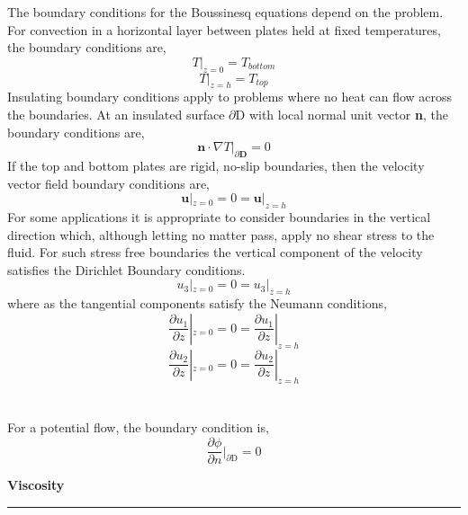 \documentclass[12pt]{article}
\begin{document}
\begin{flushleft}
The boundary conditions for the Boussinesq equations depend on the problem. For convection in a horizontal layer between plates held at fixed temperatures, the boundary conditions are,
$$T|_{z=0} = T_{bottom}$$
$$T|_{z=h} = T_{top}$$
Insulating boundary conditions apply to problems where no heat can flow across the boundaries. At an insulated surface $\partial$D with local normal unit vector \textbf{n}, the boundary conditions are,
$$\textbf{n}\cdot\nabla T|_{\partial \textbf{D}} = 0$$
If the top and bottom plates are rigid, no-slip boundaries, then the velocity vector field boundary conditions are,
$$\textbf{u}|_{z=0} = 0 = \textbf{u}|_{z=h}$$
For some applications it is appropriate to consider boundaries in the vertical direction which, although letting no matter pass, apply no shear stress to the fluid. For such stress free boundaries the vertical component of the velocity satisfies the Dirichlet Boundary conditions.
$$u_3|_{z=0} = 0 = u_3|_{z=h}$$
where as the tangential components satisfy the Neumann conditions,
$$\frac{\partial u_1}{\partial z}|_{z=0} = 0 = \frac{\partial u_1}{\partial z}|_{z=h}$$
$$\frac{\partial u_2}{\partial z}|_{z=0} = 0 = \frac{\partial u_2}{\partial z}|_{z=h}$$
\\~\\
For a potential flow, the boundary condition is,
$$\frac{\partial\phi}{\partial n}\Bigg|_{\partial \text{D}} = 0$$
\end{flushleft}

\pagebreak

\begin{huge}
\begin{center}
\textbf{Viscosity}
\noindent\rule{16.5cm}{0.4pt}
\end{center}
\end{huge}
\end{document}
